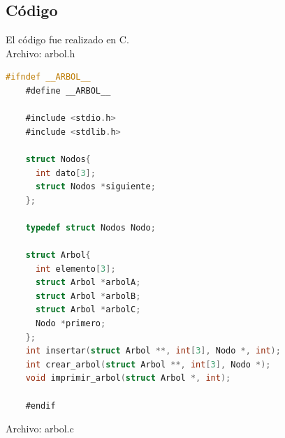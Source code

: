 	\subsection{Código}
	El código fue realizado en C.
	\\Archivo: arbol.h
	\begin{lstlisting}[language=C]
	#ifndef __ARBOL__
	#define __ARBOL__

	#include <stdio.h>
	#include <stdlib.h>

	struct Nodos{
	  int dato[3];
	  struct Nodos *siguiente;
	};

	typedef struct Nodos Nodo;

	struct Arbol{
	  int elemento[3];
	  struct Arbol *arbolA;
	  struct Arbol *arbolB;
	  struct Arbol *arbolC;
	  Nodo *primero;
	};
	int insertar(struct Arbol **, int[3], Nodo *, int);
	int crear_arbol(struct Arbol **, int[3], Nodo *);
	void imprimir_arbol(struct Arbol *, int);

	#endif
	\end{lstlisting}
	Archivo: arbol.c
